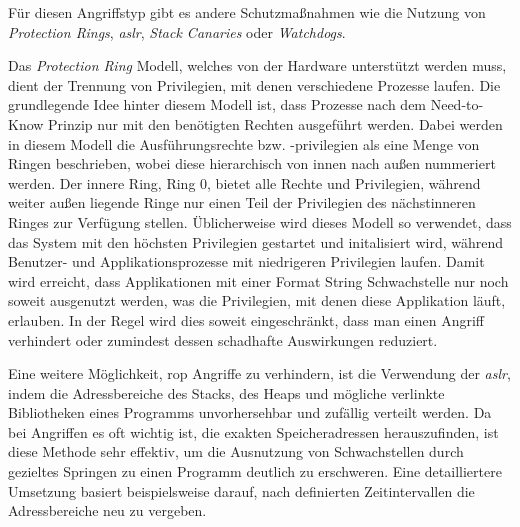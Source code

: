 \documentclass[a4paper,
DIV=13,
12pt,
BCOR=10mm,
department=FakIM,
oneside,
parskip=half,
automark,
listof=totocnumbered,
bibliography=totocnumbered,
acronym=totocnumbered
] {OTHRartcl}
\begin{document}
Für diesen Angriffstyp gibt es andere Schutzmaßnahmen wie die Nutzung von \textit{Protection Rings}, \textit{\ac{aslr}}, \textit{Stack Canaries} oder \textit{Watchdogs}.

Das \textit{Protection Ring} Modell, welches von der Hardware unterstützt werden muss, dient der Trennung von Privilegien, mit denen verschiedene Prozesse laufen.
Die grundlegende Idee hinter diesem Modell ist, dass Prozesse nach dem Need-to-Know Prinzip nur mit den benötigten Rechten ausgeführt werden.
Dabei werden in diesem Modell die Ausführungsrechte bzw. -privilegien
als eine Menge von Ringen beschrieben, wobei diese hierarchisch von innen nach außen nummeriert werden.
Der innere Ring, Ring 0, bietet alle Rechte und Privilegien, während weiter außen liegende Ringe nur einen Teil der Privilegien des nächstinneren Ringes zur Verfügung stellen.
Üblicherweise wird dieses Modell so verwendet, dass das System mit den höchsten Privilegien gestartet und initalisiert wird, während Benutzer- und Applikationsprozesse mit niedrigeren Privilegien
laufen. Damit wird erreicht, dass Applikationen mit einer Format String Schwachstelle nur noch soweit ausgenutzt werden, was die Privilegien, mit denen diese Applikation läuft, erlauben.
In der Regel wird dies soweit eingeschränkt, dass man einen Angriff verhindert oder zumindest dessen schadhafte Auswirkungen reduziert. \cite{Operating System Concepts}

Eine weitere Möglichkeit, \ac{rop} Angriffe zu verhindern, ist die Verwendung der \textit{\ac{aslr}}, indem die Adressbereiche des Stacks, des Heaps und mögliche verlinkte Bibliotheken eines Programms unvorhersehbar und zufällig verteilt werden.
Da bei Angriffen es oft wichtig ist, die exakten Speicheradressen herauszufinden, ist diese Methode sehr effektiv, um die Ausnutzung von Schwachstellen durch gezieltes Springen zu einen Programm deutlich zu erschweren.
Eine detailliertere Umsetzung basiert beispielsweise darauf, nach definierten Zeitintervallen die Adressbereiche neu zu vergeben. \cite{OWASP Buffer Overflow} \cite{OWASP Buffer Overflow Attack}
\end{document}
